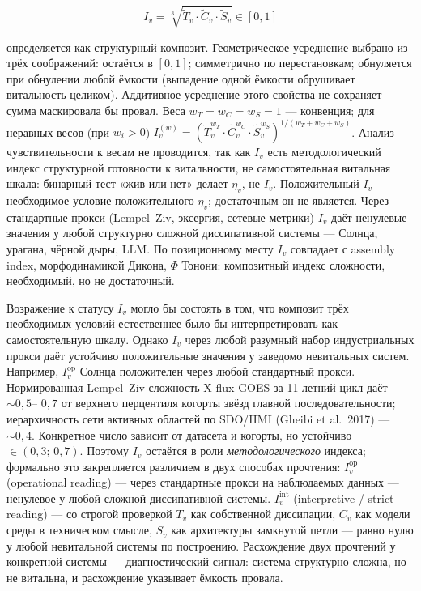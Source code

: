 \documentclass[pdflatex,sn-mathphys-ay]{sn-jnl}
\begin{document}
\begin{equation}I_v = \sqrt[3]{\tilde{T}_v \cdot \tilde{C}_v \cdot \tilde{S}_v} \in [0, 1] \tag{2b}\end{equation}

определяется как структурный композит. Геометрическое усреднение выбрано из трёх соображений: остаётся в \([0, 1]\); симметрично по перестановкам; обнуляется при обнулении любой ёмкости (выпадение одной ёмкости обрушивает витальность целиком). Аддитивное усреднение этого свойства не сохраняет --- сумма маскировала бы провал. Веса \(w_T = w_C = w_S = 1\) --- конвенция; для неравных весов (при \(w_i > 0\)) \(I_v^{(w)} = (\tilde{T}_v^{w_T} \cdot \tilde{C}_v^{w_C} \cdot \tilde{S}_v^{w_S})^{1/(w_T + w_C + w_S)}\). Анализ чувствительности к весам не проводится, так как \(I_v\) есть методологический индекс структурной готовности к витальности, не самостоятельная витальная шкала: бинарный тест «жив или нет» делает \(\eta_v\), не \(I_v\). Положительный \(I_v\) --- необходимое условие положительного \(\eta_v\); достаточным он не является. Через стандартные прокси (Lempel--Ziv, эксергия, сетевые метрики) \(I_v\) даёт ненулевые значения у любой структурно сложной диссипативной системы --- Солнца, урагана, чёрной дыры, LLM. По позиционному месту \(I_v\) совпадает с assembly index, морфодинамикой Дикона, \(\Phi\) Тонони: композитный индекс сложности, необходимый, но не достаточный.

Возражение к статусу \(I_v\) могло бы состоять в том, что композит трёх необходимых условий естественнее было бы интерпретировать как самостоятельную шкалу. Однако \(I_v\) через любой разумный набор индустриальных прокси даёт устойчиво положительные значения у заведомо невитальных систем. Например, \(I_v^{\text{op}}\) Солнца положителен через любой стандартный прокси. Нормированная Lempel--Ziv-сложность X-flux GOES за 11-летний цикл даёт \(\sim 0{,}5\)-- \(0{,}7\) от верхнего перцентиля когорты звёзд главной последовательности; иерархичность сети активных областей по SDO/HMI (Gheibi et al.~2017) --- \(\sim 0{,}4\). Конкретное число зависит от датасета и когорты, но устойчиво \(\in (0{,}3;\, 0{,}7)\). Поэтому \(I_v\) остаётся в роли \emph{методологического} индекса; формально это закрепляется различием в двух способах прочтения: \(I_v^{\text{op}}\) (operational reading) --- через стандартные прокси на наблюдаемых данных --- ненулевое у любой сложной диссипативной системы. \(I_v^{\text{int}}\) (interpretive / strict reading) --- со строгой проверкой \(T_v\) как собственной диссипации, \(C_v\) как модели среды в техническом смысле, \(S_v\) как архитектуры замкнутой петли --- равно нулю у любой невитальной системы по построению. Расхождение двух прочтений у конкретной системы --- диагностический сигнал: система структурно сложна, но не витальна, и расхождение указывает ёмкость провала.
\end{document}
